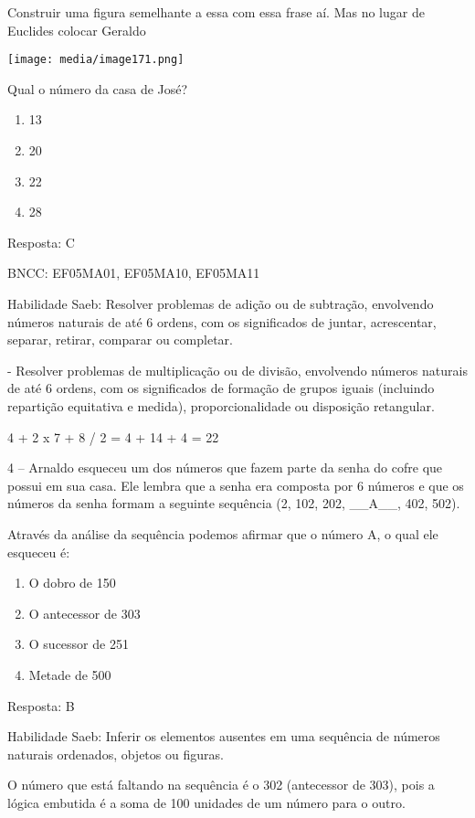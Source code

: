 Construir uma figura semelhante a essa com essa frase aí. Mas no lugar
de Euclides colocar Geraldo

\texttt{[image: media/image171.png]}

Qual o número da casa de José?

\begin{enumerate}
\def\labelenumi{\alph{enumi})}
\item
  13
\item
  20
\item
  22
\item
  28
\end{enumerate}

Resposta: C

BNCC: EF05MA01, EF05MA10, EF05MA11

Habilidade Saeb: Resolver problemas de adição ou de subtração,
envolvendo números naturais de até 6 ordens, com os significados de
juntar, acrescentar, separar, retirar, comparar ou completar.

- Resolver problemas de multiplicação ou de divisão, envolvendo números
naturais de até 6 ordens, com os significados de formação de grupos
iguais (incluindo repartição equitativa e medida), proporcionalidade ou
disposição retangular.

4 + 2 x 7 + 8 / 2 = 4 + 14 + 4 = 22

4 -- Arnaldo esqueceu um dos números que fazem parte da senha do cofre
que possui em sua casa. Ele lembra que a senha era composta por 6
números e que os números da senha formam a seguinte sequência (2, 102,
202, \_\_A\_\_, 402, 502).

Através da análise da sequência podemos afirmar que o número A, o qual
ele esqueceu é:

\begin{enumerate}
\def\labelenumi{\alph{enumi})}
\item
  O dobro de 150
\item
  O antecessor de 303
\item
  O sucessor de 251
\item
  Metade de 500
\end{enumerate}

Resposta: B

Habilidade Saeb: Inferir os elementos ausentes em uma sequência de
números naturais ordenados, objetos ou figuras.

O número que está faltando na sequência é o 302 (antecessor de 303),
pois a lógica embutida é a soma de 100 unidades de um número para o
outro.

